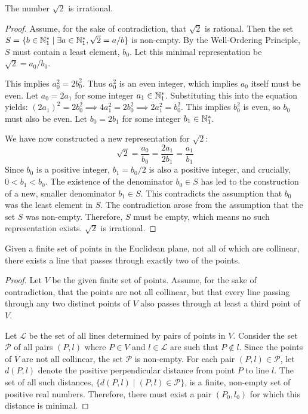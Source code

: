 \begin{theorem}
\begin{theorem}
The number $\sqrt{2}$ is irrational.
\end{theorem}
\begin{proof}
Assume, for the sake of contradiction, that $\sqrt{2}$ is rational. Then the set $S = \{ b \in \mathbb{N}_{1}^* \mid \exists a \in \mathbb{N}_{1}^*, \sqrt{2} = a/b \}$ is non-empty. By the Well-Ordering Principle, $S$ must contain a least element, $b_0$. Let this minimal representation be $\sqrt{2} = a_0/b_0$.

This implies $a_0^2 = 2b_0^2$. Thus $a_0^2$ is an even integer, which implies $a_0$ itself must be even. Let $a_0 = 2a_1$ for some integer $a_1 \in \mathbb{N}_{1}^*$.
Substituting this into the equation yields:
$(2a_1)^2 = 2b_0^2 \implies 4a_1^2 = 2b_0^2 \implies 2a_1^2 = b_0^2$.
This implies $b_0^2$ is even, so $b_0$ must also be even. Let $b_0 = 2b_1$ for some integer $b_1 \in \mathbb{N}_{1}^*$.

We have now constructed a new representation for $\sqrt{2}$:
$$ \sqrt{2} = \frac{a_0}{b_0} = \frac{2a_1}{2b_1} = \frac{a_1}{b_1} $$
Since $b_0$ is a positive integer, $b_1 = b_0/2$ is also a positive integer, and crucially, $0 < b_1 < b_0$.
The existence of the denominator $b_0 \in S$ has led to the construction of a new, smaller denominator $b_1 \in S$. This contradicts the assumption that $b_0$ was the least element in $S$.
The contradiction arose from the assumption that the set $S$ was non-empty. Therefore, $S$ must be empty, which means no such representation exists. $\sqrt{2}$ is irrational.
\end{proof}

\begin{theorem}
Given a finite set of points in the Euclidean plane, not all of which are collinear, there exists a line that passes through exactly two of the points.
\end{theorem}
\begin{proof}
Let $V$ be the given finite set of points. Assume, for the sake of contradiction, that the points are not all collinear, but that every line passing through any two distinct points of $V$ also passes through at least a third point of $V$.

Let $\mathcal{L}$ be the set of all lines determined by pairs of points in $V$. Consider the set $\mathcal{P}$ of all pairs $(P, l)$ where $P \in V$ and $l \in \mathcal{L}$ are such that $P \notin l$. Since the points of $V$ are not all collinear, the set $\mathcal{P}$ is non-empty.
For each pair $(P,l) \in \mathcal{P}$, let $d(P,l)$ denote the positive perpendicular distance from point $P$ to line $l$. The set of all such distances, $\{d(P,l) \mid (P,l) \in \mathcal{P}\}$, is a finite, non-empty set of positive real numbers. Therefore, there must exist a pair $(P_0, l_0)$ for which this distance is minimal.


\end{proof}
\end{theorem}
